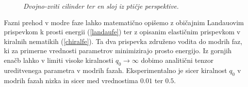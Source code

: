 \documentclass[longbibliography,slovene,a4paper,12pt]{book}
\begin{document}
\begin{figure}[h!]
\begin{subfigure}[b]{0.5\textwidth}
	\label{fig:dtc_z}
	\end{subfigure}
	\caption{\emph{Dvojno-zviti cilinder ter en sloj iz ptičje perspektive.}}
\end{figure}

Fazni prehod v modre faze lahko matematično opišemo z običajnim Landauovim prispevkom k prosti energii (\ref{landaufe}) ter z opisanim elastičnim prispevkom v kiralnih nematikih (\ref{chiralfe}). Ta dva prispevka združeno vodita do modrih faz, ki za primerne vrednosti parametrov minimizirajo prosto energijo. Iz gornjih enačb lahko v limiti visoke kiralnosti $q_0\rightarrow \infty$ dobimo analitični tenzor ureditvenega parametra v modrih fazah\cite{wright}. Eksperimentalno je sicer kiralnost $q_0$ v modrih fazah nizka in sicer med vrednostima $0.01$ ter $0.5$\cite{wright}.\\
\end{document}
